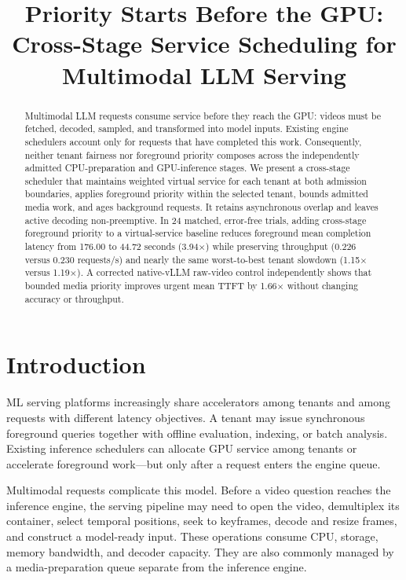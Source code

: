 \documentclass[sigconf,review,anonymous]{acmart}
\title{Priority Starts Before the GPU:\\
Cross-Stage Service Scheduling for Multimodal LLM Serving}
\begin{document}
\begin{abstract}
Multimodal LLM requests consume service before they reach the GPU: videos must
be fetched, decoded, sampled, and transformed into model inputs. Existing
engine schedulers account only for requests that have completed this work.
Consequently, neither tenant fairness nor foreground priority composes across
the independently admitted CPU-preparation and GPU-inference stages. We
present a cross-stage scheduler that maintains weighted virtual service for
each tenant at both admission boundaries, applies foreground priority within
the selected tenant, bounds admitted media work, and ages background requests.
It retains asynchronous overlap and leaves active decoding non-preemptive. In
24 matched, error-free trials, adding cross-stage foreground priority to a
virtual-service baseline reduces foreground mean completion latency from
176.00 to 44.72 seconds (3.94$\times$) while preserving throughput (0.226
versus 0.230 requests/s) and nearly the same worst-to-best tenant slowdown
(1.15$\times$ versus 1.19$\times$). A corrected native-vLLM raw-video control
independently shows that bounded media priority improves urgent mean TTFT by
1.66$\times$ without changing accuracy or throughput.
\end{abstract}

\maketitle

\section{Introduction}

ML serving platforms increasingly share accelerators among tenants and among
requests with different latency objectives. A tenant may issue synchronous
foreground queries together with offline evaluation, indexing, or batch
analysis. Existing inference schedulers can allocate GPU service among
tenants or accelerate foreground work---but only after a request enters the
engine queue.

Multimodal requests complicate this model. Before a video question reaches
the inference engine, the serving pipeline may need to open the video,
demultiplex its container, select temporal positions, seek to keyframes,
decode and resize frames, and construct a model-ready input. These operations
consume CPU, storage, memory bandwidth, and decoder capacity. They are also
commonly managed by a media-preparation queue separate from the inference
engine.
\end{document}
